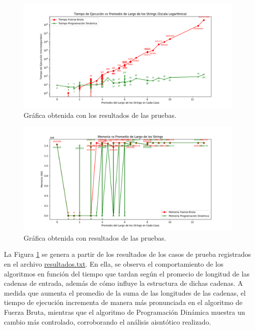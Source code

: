\begin{figure}[H]
    \centering
    \includegraphics[width=1\textwidth]{images/Figure_1.png}
    \caption{Gráfica obtenida con los resultados de las pruebas.}
    \label{fig:tiempo}
\end{figure}
\begin{figure}[H]
    \centering
    \includegraphics[width=1\textwidth]{images/Figure_2.png}
    \caption{Gráfica obtenida con resultados de las pruebas.}
    \label{fig:memoria}
\end{figure}

La Figura \ref{fig:tiempo} se genera a partir de los resultados de los casos de prueba registrados en el archivo \href{https://github.com/luphin/Tarea2y3Algoritmos-FB-PD/blob/main/codigos/resultados.txt}{resultados.txt}. En ella, se observa el comportamiento de los algoritmos en función del tiempo que tardan según el promecio de longitud de las cadenas de entrada, además de cómo influye la estructura de dichas cadenas. A medida que aumenta el promedio de la suma de las longitudes de las cadenas, el tiempo de ejecución incrementa de manera más pronunciada en el algoritmo de Fuerza Bruta, mientras que el algoritmo de Programación Dinámica muestra un cambio más controlado, corroborando el análisis aisntótico realizado.

